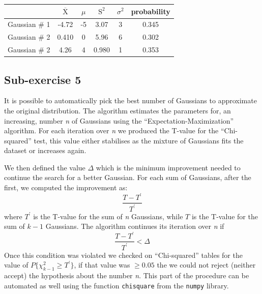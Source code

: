\documentclass[10pt,a4paper]{article}
\begin{document}
\begin{center}
  \begin{tabular}{c|c c c c c}
    & \(\overline{\text{X}}\) & \(\mu\) & \(\text{S}^2\) & \(\sigma^2\) & probability\\
    \hline
    Gaussian \# 1 & -4.72 & -5 & 3.07 & 3 & 0.345\\
    \hline
    Gaussian \# 2 & 0.410 & 0 & 5.96 & 6 & 0.302\\
    \hline
    Gaussian \# 2 & 4.26 & 4 & 0.980 & 1 & 0.353\\
    \hline
  \end{tabular}
\end{center}

\subsection*{Sub-exercise 5}

It is possible to automatically pick the best number of Gaussians to approximate the original distribution. The algorithm estimates the parameters for, an increasing, number \emph{n} of Gaussians using the ``Expectation-Maximization'' algorithm. For each iteration over \emph{n} we produced the T-value for the ``Chi-squared'' test, this value either stabilises as the mixture of Gaussians fits the dataset or increases again.%

We then defined the value \(\Delta\) which is the minimum improvement needed to continue the search for a better Gaussian. For each sum of Gaussians, after the first, we computed the improvement as: \[\frac{T - T^\prime}{T^\prime}\] where \(T^{\prime}\) is the T-value for the sum of \emph{n} Gaussians, while \(T\) is the T-value for the sum of \(k-1\) Gaussians. The algorithm continues its iteration over \emph{n} if \[\frac{T - T^\prime}{T^\prime} < \Delta\]%
Once this condition was violated we checked on ``Chi-squared'' tables for the value of \(P\{\chi^{2}_{k-1} \geq T^\prime\}\), if that value was \(\geq 0.05\) the we could not reject (neither accept) the hypothesis about the number \emph{n}. This part of the procedure can be automated as well using the function \texttt{chisquare} from the \texttt{numpy} library.
\end{document}
